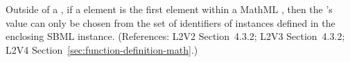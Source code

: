 Outside of a \FunctionDefinition, if a  element is the
first element within a MathML , then the 's
value can only be chosen from the set of identifiers of
\FunctionDefinition{} instances defined in the
enclosing SBML \Model instance.
(References: L2V2 Section~4.3.2; L2V3 Section~4.3.2; L2V4 
Section~\ref{sec:function-definition-math}.)
